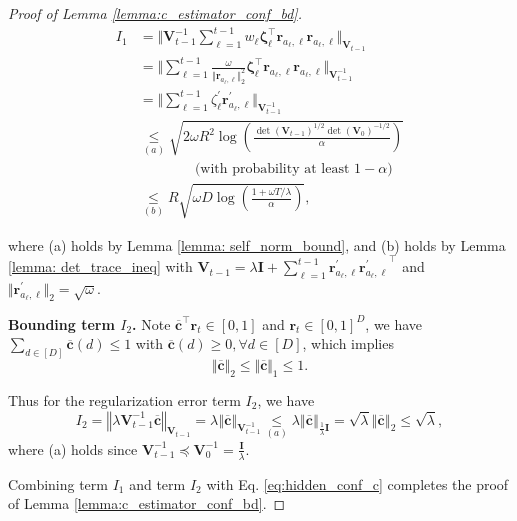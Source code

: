 \begin{proof}[Proof of Lemma \ref{lemma:c_estimator_conf_bd}]
\begin{equation}
\begin{aligned}
\label{eq: hidden_conf_c_I_1_error}
I_1 
& = 
\Big \Vert 
\boldsymbol{V}_{t-1}^{-1} \sum_{\ell = 1}^{t-1} w_{\ell} \boldsymbol{\zeta}_{\ell}^{\top} \boldsymbol{r}_{a_{\ell}, \ell} \boldsymbol{r}_{a_{\ell}, \ell}
\Big \Vert_{\boldsymbol{V}_{t-1}} \\
& = 
\Big \Vert 
\sum_{\ell = 1}^{t-1} \frac{\omega}{\Vert \boldsymbol{r}_{a_{\ell}, \ell} \Vert_2^2} \boldsymbol{\zeta}_{\ell}^{\top} \boldsymbol{r}_{a_{\ell}, \ell} \boldsymbol{r}_{a_{\ell}, \ell}
\Big \Vert_{\boldsymbol{V}_{t-1}^{-1}} \\
& = 
\Big \Vert 
\sum_{\ell = 1}^{t-1} \zeta_{\ell}^{\prime} \boldsymbol{r}_{a_{\ell}, \ell}^{\prime}
\Big \Vert_{\boldsymbol{V}_{t-1}^{-1}} \\
& \underset{(a)}{\leq}
\sqrt{2 \omega R^2 \log \left(\frac{\det(\boldsymbol{V}_{t-1})^{1/2} \det(\boldsymbol{V}_{0})^{-1/2}}{\alpha} \right)} \\
& \qquad \qquad \text{(with probability at least }1-\alpha) \\
& \underset{(b)}{\leq}
R \sqrt{ \omega D \log \left(\frac{1 + \omega T/\lambda}{\alpha} \right)},
\end{aligned}
\end{equation}

where (a) holds by Lemma \ref{lemma: self_norm_bound}, and (b) holds by Lemma \ref{lemma: det_trace_ineq} with $\boldsymbol{V}_{t-1} = \lambda \boldsymbol{I} + \sum_{\ell   =1}^{t-1} \boldsymbol{r}_{a_{\ell}, \ell}^{\prime} {\boldsymbol{r}_{a_{\ell}, \ell}^{\prime}}^{\top}$ and $\Vert \boldsymbol{r}_{a_{\ell}, \ell}^{\prime} \Vert _2 = \sqrt{\omega}$.

\textbf{Bounding term $I_2$.}
Note $\overline{\boldsymbol{c}}^{\top} \boldsymbol{r}_t \in [0,1]$ and $\boldsymbol{r}_t \in [0,1]^D$, we have $\sum_{d \in [D]} \overline{\boldsymbol{c}}(d) \leq 1$ with $\overline{\boldsymbol{c}}(d) \geq 0, \forall d \in [D]$, which implies
\[
\Vert \overline{\boldsymbol{c}} \Vert_2
\leq 
\Vert \overline{\boldsymbol{c}} \Vert_1
\leq 
1.
\]

Thus for the regularization error term $I_2$, we have
\[
I_2 = \left \Vert 
\lambda \boldsymbol{V}_{t-1}^{-1} \overline{\boldsymbol{c}}
\right \Vert_{\boldsymbol{V}_{t-1}} = 
\lambda \left \Vert 
\overline{\boldsymbol{c}} \right \Vert_{\boldsymbol{V}_{t-1}^{-1}} 
\underset{(a)}{\leq}
\lambda \left \Vert 
\overline{\boldsymbol{c}} \right \Vert_{\frac{1}{\lambda}\boldsymbol{I}}
=
\sqrt{\lambda} \left \Vert 
\overline{\boldsymbol{c}} \right \Vert_{2}
\leq 
\sqrt{\lambda},
\]
where (a) holds since $\boldsymbol{V}_{t-1}^{-1} \preceq \boldsymbol{V}_{0}^{-1} = \frac{\boldsymbol{I}}{\lambda}$.

Combining term $I_1$ and term $I_2$ with Eq. \ref{eq:hidden_conf_c} completes the proof of Lemma \ref{lemma:c_estimator_conf_bd}.
\end{proof}


